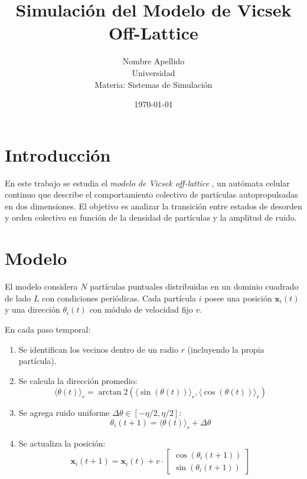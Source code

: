 \documentclass[12pt,a4paper]{article}
\title{\textbf{Simulación del Modelo de Vicsek Off-Lattice}}
\author{Nombre Apellido \\ Universidad \\ Materia: Sistemas de Simulación}
\date{\today}
\begin{document}
\maketitle

\section{Introducción}
En este trabajo se estudia el \textit{modelo de Vicsek off-lattice} \cite{vicsek1995novel}, un autómata celular continuo que describe el comportamiento colectivo de partículas autopropulsadas en dos dimensiones.  
El objetivo es analizar la transición entre estados de desorden y orden colectivo en función de la densidad de partículas y la amplitud de ruido.

\section{Modelo}
El modelo considera $N$ partículas puntuales distribuidas en un dominio cuadrado de lado $L$ con condiciones periódicas.  
Cada partícula $i$ posee una posición $\bm{x}_i(t)$ y una dirección $\theta_i(t)$ con módulo de velocidad fijo $v$.  

En cada paso temporal:
\begin{enumerate}
    \item Se identifican los vecinos dentro de un radio $r$ (incluyendo la propia partícula).
    \item Se calcula la dirección promedio:
    \begin{equation}
        \langle \theta(t) \rangle_r = \arctan2\left( \langle \sin(\theta(t)) \rangle_r, \langle \cos(\theta(t)) \rangle_r \right)
        \label{eq:promedio}
    \end{equation}
    \item Se agrega ruido uniforme $\Delta\theta \in [-\eta/2, \eta/2]$:
    \begin{equation}
        \theta_i(t+1) = \langle \theta(t) \rangle_r + \Delta\theta
        \label{eq:ruido}
    \end{equation}
    \item Se actualiza la posición:
    \begin{equation}
        \bm{x}_i(t+1) = \bm{x}_i(t) + v \cdot \begin{bmatrix} \cos(\theta_i(t+1)) \\ \sin(\theta_i(t+1)) \end{bmatrix}
        \label{eq:posicion}
    \end{equation}
\end{enumerate}
\end{document}
